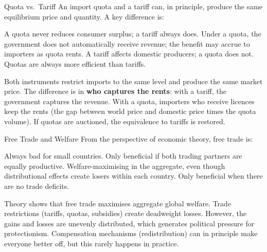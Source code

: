 \documentclass[paper=a5]{scrartcl}
\begin{document}
\begin{question}[type=mc]{Quota vs.\ Tariff}
An import quota and a tariff can, in principle, produce the same equilibrium
price and quantity. A key difference is:
\begin{choices}
  \choice        A quota never reduces consumer surplus; a tariff always does.
  \correctchoice Under a quota, the government does not automatically receive
                 revenue; the benefit may accrue to importers as quota rents.
  \choice        A tariff affects domestic producers; a quota does not.
  \choice        Quotas are always more efficient than tariffs.
\end{choices}
\begin{solution}
  Both instruments restrict imports to the same level and produce the same
  market price. The difference is in \textbf{who captures the rents}: with a
  tariff, the government captures the revenue. With a quota, importers who
  receive licences keep the rents (the gap between world price and domestic
  price times the quota volume). If quotas are auctioned, the equivalence to
  tariffs is restored.
\end{solution}
\end{question}

\begin{question}[type=mc]{Free Trade and Welfare}
From the perspective of economic theory, free trade is:
\begin{choices}
  \choice        Always bad for small countries.
  \choice        Only beneficial if both trading partners are equally productive.
  \correctchoice Welfare-maximising in the aggregate, even though distributional
                 effects create losers within each country.
  \choice        Only beneficial when there are no trade deficits.
\end{choices}
\begin{solution}
  Theory shows that free trade maximises aggregate global welfare. Trade
  restrictions (tariffs, quotas, subsidies) create deadweight losses. However,
  the gains and losses are unevenly distributed, which generates political
  pressure for protectionism. Compensation mechanisms (redistribution) can
  in principle make everyone better off, but this rarely happens in practice.
\end{solution}
\end{question}
\end{document}
